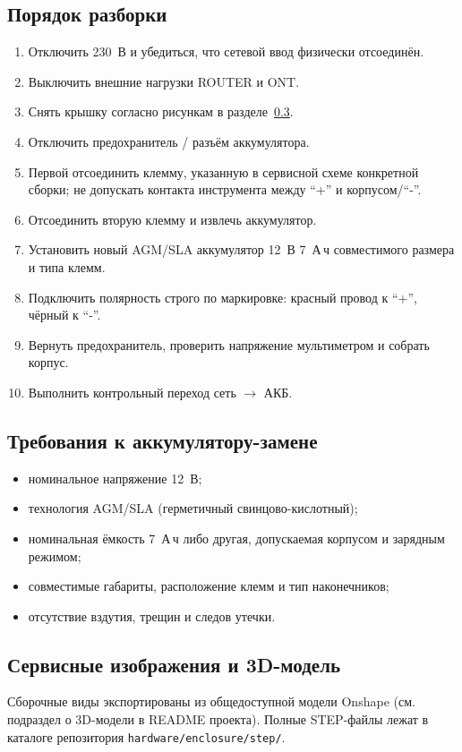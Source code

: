 \documentclass[11pt,a4paper]{article}
\begin{document}
\subsection{Порядок разборки}
\begin{enumerate}[leftmargin=8mm]
  \item Отключить 230~В и убедиться, что сетевой ввод физически отсоединён.
  \item Выключить внешние нагрузки ROUTER и ONT.
  \item Снять крышку согласно рисункам в разделе~\ref{sec:figures}.
  \item Отключить предохранитель / разъём аккумулятора.
  \item Первой отсоединить клемму, указанную в сервисной схеме конкретной сборки; не допускать контакта инструмента между ``+'' и корпусом/``-''.
  \item Отсоединить вторую клемму и извлечь аккумулятор.
  \item Установить новый AGM/SLA аккумулятор 12~В 7~А\,ч совместимого размера и типа клемм.
  \item Подключить полярность строго по маркировке: красный провод к ``+'', чёрный к ``-''.
  \item Вернуть предохранитель, проверить напряжение мультиметром и собрать корпус.
  \item Выполнить контрольный переход сеть $\rightarrow$ АКБ.
\end{enumerate}

\subsection{Требования к аккумулятору-замене}
\begin{itemize}[leftmargin=7mm]
  \item номинальное напряжение 12~В;
  \item технология AGM/SLA (герметичный свинцово-кислотный);
  \item номинальная ёмкость 7~А\,ч либо другая, допускаемая корпусом и зарядным режимом;
  \item совместимые габариты, расположение клемм и тип наконечников;
  \item отсутствие вздутия, трещин и следов утечки.
\end{itemize}

\subsection{Сервисные изображения и 3D-модель}\label{sec:figures}
Сборочные виды экспортированы из общедоступной модели Onshape (см. подраздел о 3D-модели в README проекта). Полные STEP-файлы лежат в каталоге репозитория \texttt{hardware/enclosure/step/}.
\end{document}
